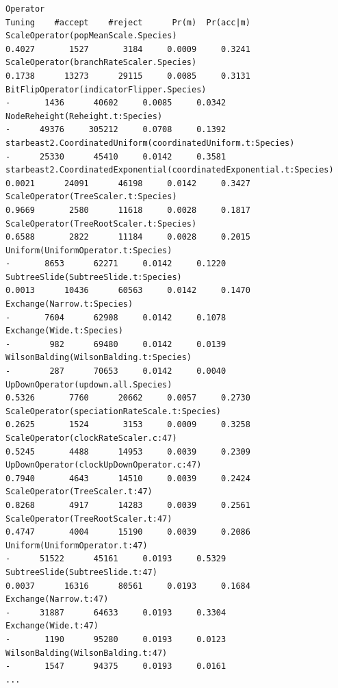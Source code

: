 \documentclass{article}
\begin{document}
{\begin{verbatim}
Operator                                                                Tuning    #accept    #reject      Pr(m)  Pr(acc|m)
ScaleOperator(popMeanScale.Species)                                     0.4027       1527       3184     0.0009     0.3241 
ScaleOperator(branchRateScaler.Species)                                 0.1738      13273      29115     0.0085     0.3131 
BitFlipOperator(indicatorFlipper.Species)                                    -       1436      40602     0.0085     0.0342 
NodeReheight(Reheight.t:Species)                                             -      49376     305212     0.0708     0.1392 
starbeast2.CoordinatedUniform(coordinatedUniform.t:Species)                  -      25330      45410     0.0142     0.3581 
starbeast2.CoordinatedExponential(coordinatedExponential.t:Species)     0.0021      24091      46198     0.0142     0.3427 
ScaleOperator(TreeScaler.t:Species)                                     0.9669       2580      11618     0.0028     0.1817 
ScaleOperator(TreeRootScaler.t:Species)                                 0.6588       2822      11184     0.0028     0.2015 
Uniform(UniformOperator.t:Species)                                           -       8653      62271     0.0142     0.1220 
SubtreeSlide(SubtreeSlide.t:Species)                                    0.0013      10436      60563     0.0142     0.1470 
Exchange(Narrow.t:Species)                                                   -       7604      62908     0.0142     0.1078 
Exchange(Wide.t:Species)                                                     -        982      69480     0.0142     0.0139 
WilsonBalding(WilsonBalding.t:Species)                                       -        287      70653     0.0142     0.0040 
UpDownOperator(updown.all.Species)                                      0.5326       7760      20662     0.0057     0.2730 
ScaleOperator(speciationRateScale.t:Species)                            0.2625       1524       3153     0.0009     0.3258 
ScaleOperator(clockRateScaler.c:47)                                     0.5245       4488      14953     0.0039     0.2309 
UpDownOperator(clockUpDownOperator.c:47)                                0.7940       4643      14510     0.0039     0.2424 
ScaleOperator(TreeScaler.t:47)                                          0.8268       4917      14283     0.0039     0.2561 
ScaleOperator(TreeRootScaler.t:47)                                      0.4747       4004      15190     0.0039     0.2086 
Uniform(UniformOperator.t:47)                                                -      51522      45161     0.0193     0.5329 
SubtreeSlide(SubtreeSlide.t:47)                                         0.0037      16316      80561     0.0193     0.1684 
Exchange(Narrow.t:47)                                                        -      31887      64633     0.0193     0.3304 
Exchange(Wide.t:47)                                                          -       1190      95280     0.0193     0.0123 
WilsonBalding(WilsonBalding.t:47)                                            -       1547      94375     0.0193     0.0161 
...


\end{verbatim}}
\end{document}
